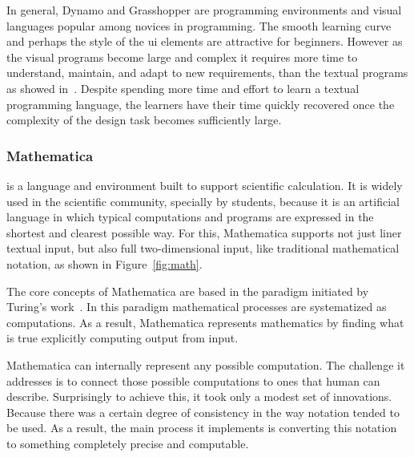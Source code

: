 In general, Dynamo and Grasshopper are programming environments and visual languages popular among novices in programming. The smooth learning curve and perhaps the style of the \ac{ui} elements are attractive for beginners. However as the visual programs become large and complex it requires more time to understand, maintain, and adapt to new requirements, than the textual programs as showed in~\cite{leitao2011programming}. Despite spending more time and effort to learn a textual programming language, the learners have their time quickly recovered once the complexity of the design task becomes sufficiently large.
\subsubsection{Mathematica~\cite{wolfram1991mathematica}} is a language and environment built to support scientific calculation. It is widely used in the scientific community, specially by students, because it is an artificial language in which typical computations and programs are expressed in the shortest and clearest possible way. For this, Mathematica supports not just liner textual input, but also full two-dimensional input, like traditional mathematical notation, as shown in Figure~\ref{fig:math}.

The core concepts of Mathematica are based in the paradigm initiated by Turing's work~\cite{wolfram2003wolfram}. In this paradigm mathematical processes are systematized as computations. As a result, Mathematica represents mathematics by finding what is true explicitly computing output from input.

Mathematica can internally represent any possible computation. The challenge it addresses is to connect those possible computations to ones that human can describe. Surprisingly to achieve this, it took only a modest set of innovations. Because there was a certain degree of consistency in the way notation tended to be used. As a result, the main process it implements is converting this notation to something completely precise and computable. 

